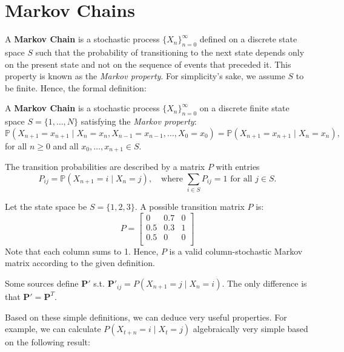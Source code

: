 \documentclass[../../main.tex]{subfiles}
\begin{document}
\section{Markov Chains}

A \textbf{Markov Chain} is a stochastic process $\{X_n\}_{n=0}^\infty$ defined on a discrete state space $S$ such that the probability of transitioning to the next state depends only on the present state and not on the sequence of events that preceded it. This property is known as the \emph{Markov property}. For simplicity's sake, we assume $S$ to be finite. Hence, the formal definition:



\begin{definition}
A \textbf{Markov Chain} is a stochastic process $\{X_n\}_{n=0}^\infty$ on a discrete finite state space $S = \{1, \dots , N\}$ satisfying the \emph{Markov property}:
\[
\mathbb{P}(X_{n+1} = x_{n+1} \mid X_n = x_n, X_{n-1} = x_{n-1}, \dots, X_0 = x_0) = \mathbb{P}(X_{n+1} = x_{n+1} \mid X_n = x_n),
\]
for all $n \geq 0$ and all $x_0, \dots, x_{n+1} \in S$.

\noindent
The transition probabilities are described by a matrix $P$ with entries
\[
P_{ij} = \mathbb{P}(X_{n+1} = i \mid X_n = j), \quad \text{where } \sum_{i \in S} P_{ij} = 1 \text{ for all } j \in S.
\]
\end{definition}


\begin{example}
\label{ex:markov_chain}
Let the state space be $S = \{1, 2, 3\}$. A possible transition matrix $P$ is:
\[
P =
\begin{bmatrix}
0 & 0.7 & 0 \\
0.5 & 0.3 & 1 \\
0.5 & 0 & 0 \\
\end{bmatrix}
\]
Note that each column sums to 1.
Hence, $P$ is a valid column-stochastic Markov matrix according to the given definition.
\end{example}


\begin{remark}
    Some sources define $\bm{P'}$ s.t. $\bm{P'}_{ij} = P(X_{n+1} = j \mid X_n = i)$. The only difference is that $\bm{P'} = \bm{P}^T$.
\end{remark}


Based on these simple definitions, we can deduce very useful properties. For example, we can calculate $P(X_{t+n} = i \mid X_t = j)$ algebraically very simple based on the following result:
\end{document}
